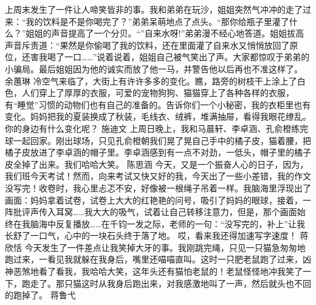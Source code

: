 {}上周末发生了一件让人啼笑皆非的事。我和弟弟在玩沙，姐姐突然气冲冲的走了过来：“我的饮料是不是你喝完了？”弟弟呆萌地点了点头。“那你给瓶子里灌了什么？”姐姐的声音提高了一个分贝。“”自来水呀!”弟弟漫不经心地答道。姐姐拔高声音斥责道：“果然是你偷喝了我的饮料，还在里面灌了自来水又悄悄放回了原位，还害我喝了一口……”说着说着，姐姐自己被气笑出了声。大家都惊叹于弟弟的小骗局。最后姐姐因为他的诚实而放了他一马，并警告他以后再也不准这样了。\markdownRendererInterblockSeparator
{}\markdownRendererInterblockSeparator
{}余蕙琳\markdownRendererInterblockSeparator
{}冷空气来临了，大街上有许许多多的变化。瞧，路旁的树枝干上涂上了白色，人们穿上了厚厚的衣服，可爱的宠物狗狗、猫猫穿上了各种各样的衣服，有“睡觉”习惯的动物们也有自己的准备的。告诉你们一个小秘密，我的衣柜里也有变化。妈妈把我的夏装换成了秋装，毛线衣、绒裤，堆满抽屉，看得我眼花缭乱。你的身边有什么变化呢？\markdownRendererInterblockSeparator
{}\markdownRendererInterblockSeparator
{}施迪文\markdownRendererInterblockSeparator
{}上周日晚上，我和马晨轩、李卓涵、孔俞橙练完球一起回家。刚出球场，只见孔俞橙朝我们晃了晃自己手中的橘子皮，猫着腰，把橘子皮放进了李卓涵的帽子里。李卓涵感到有一点不对劲，一低头，帽子里的橘子皮全掉了出来。我们哈哈大笑。\markdownRendererInterblockSeparator
{}\markdownRendererInterblockSeparator
{}陈思涵\markdownRendererInterblockSeparator
{}今天，又是一个振奋人心的日子，因为，我们班今天考试！然而，向来考试又快又好的我，今天出了一些小差错，我的作文没写完！收卷时，我心里忐忑不安，好像被一根绳子吊着一样。我脑海里浮现出了画面：妈妈拿着试卷，试卷上大大的红艳艳的问号，吸引了妈妈的眼球，接着，一阵批评声传入耳窝……我大大的吸气，试着让自己转移注意力，但是，那个画面始终在我脑海中反复播放……在千钧一发之际，老师的一句：“没写完的，补上”让我长舒了一口气，心中的一块石头终于落了地。\markdownRendererInterblockSeparator
{}哎，看来我还得加速写字速度！\markdownRendererInterblockSeparator
{}\markdownRendererInterblockSeparator
{}蒋欣恬\markdownRendererInterblockSeparator
{}今天发生了一件差点让我笑掉大牙的事。我刚跳完绳，只见一只猫急匆匆地跑过来，一看见我就躲在我身后，嘴里还喵喵直叫。这时一只肥老鼠跑了过来，凶神恶煞地看了看我，我哈哈大笑，这年头还有猫怕老鼠的！老鼠怪怪地冲我笑了一下，跑走了。那只猫这时从我身后跑出来，对我感激地叫了一声，然后就头也不回的跑掉了。\markdownRendererInterblockSeparator
{}\markdownRendererInterblockSeparator
{}蒋鲁弋\markdownRendererInterblockSeparator
